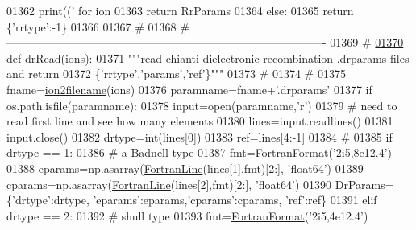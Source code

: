 \begin{DoxyCode}
{{{{{{{{{{{{01362             print((\textcolor{stringliteral}{' for ion %
01363         \textcolor{keywordflow}{return} RrParams
01364     \textcolor{keywordflow}{else}:
01365         \textcolor{keywordflow}{return} \{\textcolor{stringliteral}{'rrtype'}:-1\}
01366 
01367     \textcolor{comment}{#}
01368     \textcolor{comment}{# -------------------------------------------------------------------------------------}
01369     \textcolor{comment}{#}
\hypertarget{__chianti__tools_8py_source_l01370}{}\hyperlink{namespacepyneb_1_1utils_1_1__chianti__tools_aa29da4afe4adccd8de62c0dd97799dcd}{01370} \textcolor{keyword}{def }\hyperlink{namespacepyneb_1_1utils_1_1__chianti__tools_aa29da4afe4adccd8de62c0dd97799dcd}{drRead}(ions):
01371     \textcolor{stringliteral}{"""read chianti dielectronic recombination .drparams files and return}
01372 \textcolor{stringliteral}{        \{'rrtype','params','ref'\}"""}
01373     \textcolor{comment}{#}
01374     \textcolor{comment}{#}
01375     fname=\hyperlink{namespacepyneb_1_1utils_1_1__chianti__tools_ad4bc7b577fd4c3819ceb00b0a444351b}{ion2filename}(ions)
01376     paramname=fname+\textcolor{stringliteral}{'.drparams'}
01377     \textcolor{keywordflow}{if} os.path.isfile(paramname):
01378         input=open(paramname,\textcolor{stringliteral}{'}\textcolor{stringliteral}{r')}
01379 \textcolor{stringliteral}{        }\textcolor{comment}{#  need to read first line and see how many elements}
01380         lines=input.readlines()
01381         input.close()
01382         drtype=int(lines[0])
01383         ref=lines[4:-1]
01384         \textcolor{comment}{#}
01385         \textcolor{keywordflow}{if} drtype == 1:
01386             \textcolor{comment}{# a Badnell type}
01387             fmt=\hyperlink{classpyneb_1_1utils_1_1_fortran_format_1_1_fortran_format}{FortranFormat}(\textcolor{stringliteral}{'2i5,8e12.4'})
01388             eparams=np.asarray(\hyperlink{classpyneb_1_1utils_1_1_fortran_format_1_1_fortran_line}{FortranLine}(lines[1],fmt)[2:], \textcolor{stringliteral}{'float64'})
01389             cparams=np.asarray(\hyperlink{classpyneb_1_1utils_1_1_fortran_format_1_1_fortran_line}{FortranLine}(lines[2],fmt)[2:], \textcolor{stringliteral}{'float64'})
01390             DrParams=\{\textcolor{stringliteral}{'drtype'}:drtype, \textcolor{stringliteral}{'eparams'}:eparams,\textcolor{stringliteral}{'cparams'}:cparams,  \textcolor{stringliteral}{'ref'}:ref\}
01391         \textcolor{keywordflow}{elif} drtype == 2:
01392             \textcolor{comment}{# shull type}
01393             fmt=\hyperlink{classpyneb_1_1utils_1_1_fortran_format_1_1_fortran_format}{FortranFormat}(\textcolor{stringliteral}{'2i5,4e12.4'})
}}}}}}}}}}}}}
\end{DoxyCode}
